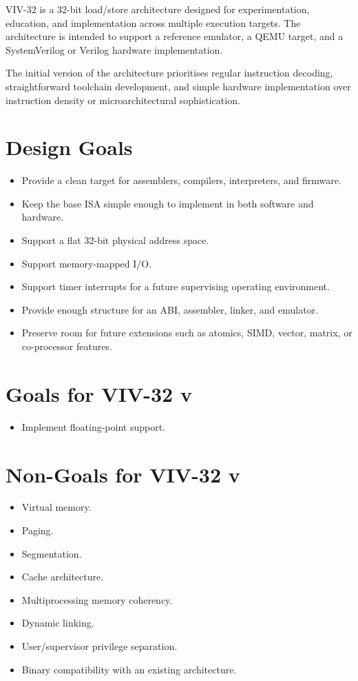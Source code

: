 VIV-32 is a 32-bit load/store architecture designed for experimentation,
education, and implementation across multiple execution targets. The
architecture is intended to support a reference emulator, a QEMU target, and
a SystemVerilog or Verilog hardware implementation.

The initial version of the architecture prioritises regular instruction
decoding, straightforward toolchain development, and simple hardware
implementation over instruction density or microarchitectural sophistication.

\section{Design Goals}

\begin{itemize}
  \item Provide a clean target for assemblers, compilers, interpreters, and
        firmware.
  \item Keep the base ISA simple enough to implement in both software and
        hardware.
  \item Support a flat 32-bit physical address space.
  \item Support memory-mapped I/O.
  \item Support timer interrupts for a future supervising operating environment.
  \item Provide enough structure for an ABI, assembler, linker, and emulator.
  \item Preserve room for future extensions such as atomics, SIMD, vector,
        matrix, or co-processor features.
\end{itemize}

\section{Goals for VIV-32 v\version}

\begin{itemize}
  \item Implement floating-point support.
\end{itemize}

\section{Non-Goals for VIV-32 v\version}

\begin{itemize}
  \item Virtual memory.
  \item Paging.
  \item Segmentation.
  \item Cache architecture.
  \item Multiprocessing memory coherency.
  \item Dynamic linking.
  \item User/supervisor privilege separation.
  \item Binary compatibility with an existing architecture.
\end{itemize}

